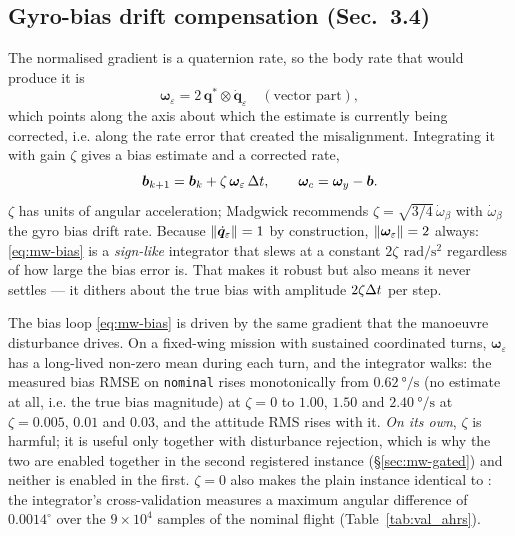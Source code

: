 \subsection{Gyro-bias drift compensation (Sec.~3.4)}
The normalised gradient is a quaternion rate, so the body rate that would produce it is
\begin{equation}
\bm{\omega}_\varepsilon = 2\,\bm{q}^*\otimes\dot{\bm{q}}_\varepsilon
\quad(\text{vector part}),
\label{eq:mw-werr}
\end{equation}
which points along the axis about which the estimate is currently being corrected, i.e. along the
rate error that created the misalignment. Integrating it with gain $\zeta$ gives a bias estimate and
a corrected rate,
\begin{equation}
\bm{b}_{k+1}=\bm{b}_k+\zeta\,\bm{\omega}_\varepsilon\,\Delta t,
\qquad \bm{\omega}_c = \bm{\omega}_y-\bm{b} .
\label{eq:mw-bias}
\end{equation}
$\zeta$ has units of angular acceleration; Madgwick recommends $\zeta=\sqrt{3/4}\,\dot\omega_\beta$
with $\dot\omega_\beta$ the gyro bias drift rate. Because $\left\lVert \dot{\bm{q}}_\varepsilon \right\rVert=1$ by
construction, $\left\lVert \bm{\omega}_\varepsilon \right\rVert=2$ always: \eqref{eq:mw-bias} is a \emph{sign-like}
integrator that slews at a constant $2\zeta\,\SI{}{\radian\per\second\squared}$ regardless of how
large the bias error is. That makes it robust but also means it never settles --- it dithers about
the true bias with amplitude $2\zeta\Delta t$ per step.

\begin{remark}[Why $\zeta=0$ in the plain \texttt{Madgwick} instance]
The bias loop \eqref{eq:mw-bias} is driven by the same gradient that the manoeuvre disturbance
drives. On a fixed-wing mission with sustained coordinated turns, $\bm{\omega}_\varepsilon$ has a
long-lived non-zero mean during each turn, and the integrator walks: the measured bias RMSE on
\texttt{nominal} rises monotonically from $\SI{0.62}{\degree\per\second}$ (no estimate at all, i.e.
the true bias magnitude) at $\zeta=0$ to $1.00$, $1.50$ and $\SI{2.40}{\degree\per\second}$ at
$\zeta=0.005$, $0.01$ and $0.03$, and the attitude RMS rises with it. \emph{On its own}, $\zeta$ is
harmful; it is useful only together with disturbance rejection, which is why the two are enabled
together in the second registered instance (\S\ref{sec:mw-gated}) and neither is enabled in the
first. $\zeta=0$ also makes the plain instance identical to : the
integrator's cross-validation measures a maximum angular difference of $0.0014^\circ$ over the
$9\times10^4$ samples of the nominal flight (Table~\ref{tab:val_ahrs}).
\end{remark}

